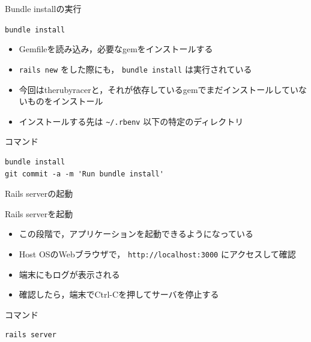 \documentclass[t, aspectratio=169]{beamer}
\begin{document}
\begin{frame}[fragile,label=sec-6-1-5]{Bundle installの実行}
 \begin{block}{\texttt{bundle install}}
\begin{itemize}
\item Gemfileを読み込み，必要なgemをインストールする
\item \texttt{rails new} をした際にも， \texttt{bundle install} は実行されている
\item 今回はtherubyracerと，それが依存しているgemでまだインストールしていないものをインストール
\item インストールする先は \texttt{\textasciitilde{}/.rbenv} 以下の特定のディレクトリ
\end{itemize}
\end{block}

\begin{block}{コマンド}
\begin{verbatim}
bundle install
git commit -a -m 'Run bundle install'
\end{verbatim}
\end{block}
\end{frame}
\begin{frame}[fragile,label=sec-6-1-6]{Rails serverの起動}
 \begin{block}{Rails serverを起動}
\begin{itemize}
\item この段階で，アプリケーションを起動できるようになっている
\item Host OSのWebブラウザで， \texttt{http://localhost:3000} にアクセスして確認
\item 端末にもログが表示される
\item 確認したら，端末でCtrl-Cを押してサーバを停止する
\end{itemize}
\end{block}

\begin{block}{コマンド}
\begin{verbatim}
rails server
\end{verbatim}
\end{block}
\end{frame}
\end{document}
